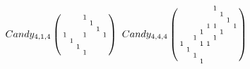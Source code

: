 $Candy_{4,1,4}\left(\begin{smallmatrix}
  &   &   & 1 &   &   &   \\
  &   &   &   & 1 &   &   \\
  &   &   &   &   & 1 &   \\
1 &   &   & 1 &   &   & 1 \\
  & 1 &   &   &   &   &   \\
  &   & 1 &   &   &   &   \\
  &   &   & 1 &   &   & 
\end{smallmatrix}\right)$
$Candy_{4,4,4}\left(\begin{smallmatrix}
  &   &   &   &   & 1 &   &   &   \\
  &   &   &   &   &   & 1 &   &   \\
  &   &   &   &   &   &   & 1 &   \\
  &   &   &   & 1 & 1 &   &   & 1 \\
  &   &   & 1 &   &   & 1 &   &   \\
  &   & 1 &   &   & 1 &   &   &   \\
1 &   &   & 1 & 1 &   &   &   &   \\
  & 1 &   &   &   &   &   &   &   \\
  &   & 1 &   &   &   &   &   &   \\
  &   &   & 1 &   &   &   &   & 
\end{smallmatrix}\right)$
